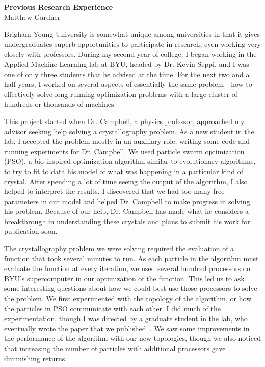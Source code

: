 \documentclass[onecolumn, 12pt]{article}
\begin{document}
\pagestyle{empty}

\begin{center}
  \textbf{Previous Research Experience}\\
  Matthew Gardner
\end{center}
\vspace{-4mm}

Brigham Young University is somewhat unique among universities in that it gives
undergraduates superb opportunities to participate in research, even working
very closely with professors.  During my second year of college, I began
working in the Applied Machine Learning lab at BYU, headed by Dr. Kevin Seppi,
and I was one of only three students that he advised at the time.  For the next
two and a half years, I worked on several aspects of essentially the same
problem---how to effectively solve long-running optimization problems with a
large cluster of hundreds or thousands of machines.

This project started when Dr. Campbell, a physics professor,  approached my
advisor seeking help solving a crystallography problem.  As a new student in
the lab, I accepted the problem mostly in an auxiliary role, writing some code
and running experiments for Dr. Campbell.  We used particle swarm optimization
(PSO), a bio-inspired optimization algorithm similar to evolutionary
algorithms, to try to fit to data his model of what was happening in a
particular kind of crystal.  After spending a lot of time seeing the output of
the algorithm, I also helped to interpret the results.  I discovered that we
had too many free parameters in our model and helped Dr.  Campbell to make
progress in solving his problem.  Because of our help, Dr.  Campbell has made
what he considers a breakthrough in understanding these crystals and plans to
submit his work for publication soon.

The crystallography problem we were solving required the evaluation of a
function that took several minutes to run.  As each particle in the algorithm
must evaluate the function at every iteration, we used several hundred
processors on BYU's supercomputer in our optimization of the function.  This
led us to ask some interesting questions about how we could best use those
processors to solve the problem.  We first experimented with the topology of
the algorithm, or how the particles in PSO communicate with each other.  I did
much of the experimentation, though I was directed by a graduate student in the
lab, who eventually wrote the paper that we
published~\cite{mcnabb-2009-large-particle-swarms}.  We saw some improvements
in the performance of the algorithm with our new topologies, though we also
noticed that increasing the number of particles with additional processors gave
diminishing returns.
\end{document}
